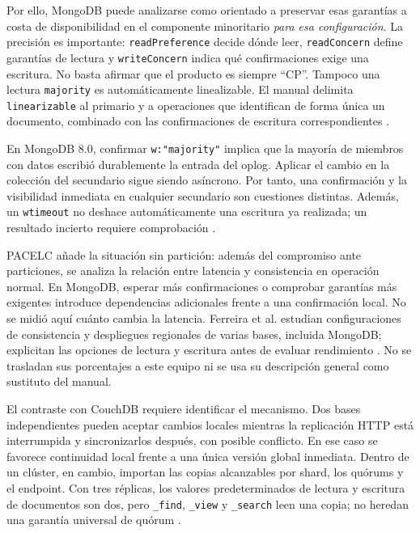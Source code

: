 Por ello, MongoDB puede analizarse como orientado a preservar esas garantías a costa de disponibilidad en el componente minoritario \textit{para esa configuración}. La precisión es importante: \texttt{readPreference} decide dónde leer, \texttt{readConcern} define garantías de lectura y \texttt{writeConcern} indica qué confirmaciones exige una escritura. No basta afirmar que el producto es siempre ``CP''. Tampoco una lectura \texttt{majority} es automáticamente linealizable. El manual delimita \texttt{linearizable} al primario y a operaciones que identifican de forma única un documento, combinado con las confirmaciones de escritura correspondientes \cite{MongoLinearizable}.

En MongoDB 8.0, confirmar \texttt{w:"majority"} implica que la mayoría de miembros con datos escribió durablemente la entrada del oplog. Aplicar el cambio en la colección del secundario sigue siendo asíncrono. Por tanto, una confirmación y la visibilidad inmediata en cualquier secundario son cuestiones distintas. Además, un \texttt{wtimeout} no deshace automáticamente una escritura ya realizada; un resultado incierto requiere comprobación \cite{MongoWriteConcern}.

PACELC añade la situación sin partición: además del compromiso ante particiones, se analiza la relación entre latencia y consistencia en operación normal. En MongoDB, esperar más confirmaciones o comprobar garantías más exigentes introduce dependencias adicionales frente a una confirmación local. No se midió aquí cuánto cambia la latencia. Ferreira et al. estudian configuraciones de consistencia y despliegues regionales de varias bases, incluida MongoDB; explicitan las opciones de lectura y escritura antes de evaluar rendimiento \cite[p.~4]{FerreiraEtAl2024}. No se trasladan sus porcentajes a este equipo ni se usa su descripción general como sustituto del manual.

El contraste con CouchDB requiere identificar el mecanismo. Dos bases independientes pueden aceptar cambios locales mientras la replicación HTTP está interrumpida y sincronizarlos después, con posible conflicto. En ese caso se favorece continuidad local frente a una única versión global inmediata. Dentro de un clúster, en cambio, importan las copias alcanzables por shard, los quórums y el endpoint. Con tres réplicas, los valores predeterminados de lectura y escritura de documentos son dos, pero \texttt{\_find}, \texttt{\_view} y \texttt{\_search} leen una copia; no heredan una garantía universal de quórum \cite{CouchShards,CouchReplication,CouchConflicts}.

